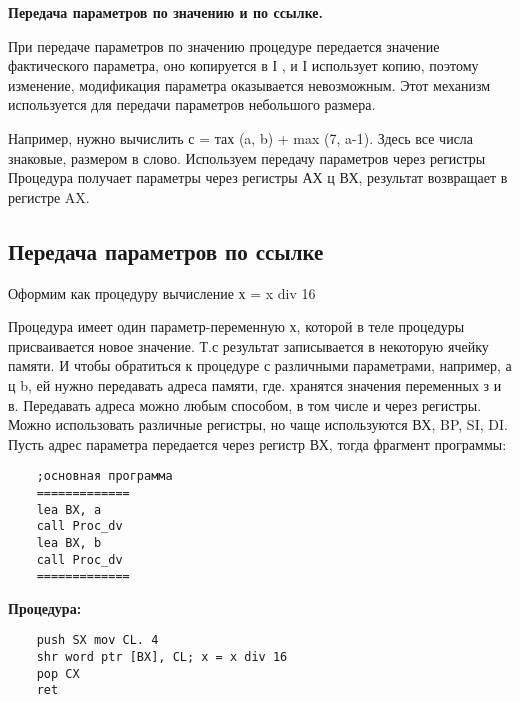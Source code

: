\textbf{Передача параметров по значению и по ссылке.}

При передаче параметров по значению процедуре передается значение фактического параметра, оно копируется в І , и І использует копию, поэтому изменение, модификация параметра оказывается невозможным. Этот механизм используется для передачи параметров небольшого размера.

Например, нужно вычислить с = тах (a, b) + max (7, a-1). Здесь все числа знаковые, размером в слово. Используем передачу параметров через регистры Процедура получает параметры через регистры АХ ц ВХ, результат возвращает в регистре AX.

\subsection{Передача параметров по ссылке}
Оформим как процедуру вычисление х = x div 16

Процедура имеет один параметр-переменную х, которой в теле процедуры присваивается новое значение. Т.с результат записывается в некоторую ячейку памяти. И чтобы обратиться к процедуре с различными параметрами, например, а ц b, ей нужно передавать адреса памяти, где. хранятся значения переменных з и в. Передавать адреса можно любым способом, в том числе и через регистры. Можно использовать различные регистры, но чаще используются ВХ, BP, SI, DI. Пусть адрес параметра передается через регистр ВХ, тогда фрагмент программы:
\begin{verbatim}
    ;основная программа
    =============
    lea BX, a 
    call Proc_dv 
    lea BX, b 
    call Proc_dv 
    =============
\end{verbatim}
\begin{center}
    \textbf{Процедура:}
\end{center}
\begin{verbatim}
    push SX mov CL. 4
    shr word ptr [BX], CL; x = x div 16
    pop CX 
    ret
\end{verbatim}